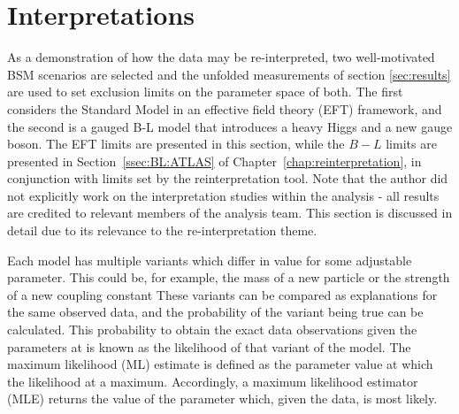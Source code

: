 \section{Interpretations}
\label{sec:interpretations}
As a demonstration of how the data may be re-interpreted, two well-motivated BSM scenarios are selected and the unfolded measurements of section \ref{sec:results} are used to set exclusion limits on the parameter space of both. The first considers the Standard Model in an effective field theory (EFT) framework, and the second is a gauged B-L model that introduces a heavy Higgs and a new gauge boson. The EFT limits are presented in this section, while the $B-L$ limits are presented in Section~\ref{ssec:BL:ATLAS} of Chapter~\ref{chap:reinterpretation}, in conjunction with limits set by the \contur reinterpretation tool. Note that the author did not explicitly work on the interpretation studies within the analysis - all results are credited to relevant members of the analysis team. This section is discussed in detail due to its relevance to the re-interpretation theme.

Each model has multiple variants which differ in value for some adjustable parameter. This could be, for example, the mass of a new particle or the strength of a new coupling constant These variants can be compared as explanations for the same observed data, and the probability of the variant being true can be calculated. This probability to obtain the exact data observations given the parameters at is known as the likelihood of that variant of the model. The maximum likelihood (ML) estimate is defined as the parameter value at which the likelihood at a maximum. Accordingly, a maximum likelihood estimator (MLE) returns the value of the parameter which, given the data, is most likely. 

